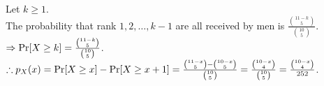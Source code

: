 \begin{pr}
Let $k\geq1$.\\
The probability that rank $1, 2, \dots, k-1$ are all received by men is $\frac{\binom{11-k}5}{\binom{10}5}$.\\
$\Rightarrow\mathrm{Pr}[X\geq k]=\frac{\binom{11-k}5}{\binom{10}5}$.\\
$\therefore p_X(x)=\mathrm{Pr}[X\geq x]-\mathrm{Pr}[X\geq x+1]=\frac{\binom{11-x}5-\binom{10-x}5}{\binom{10}5}=\frac{\binom{10-x}4}{\binom{10}5}=\frac{\binom{10-x}4}{252}$.
\end{pr}
